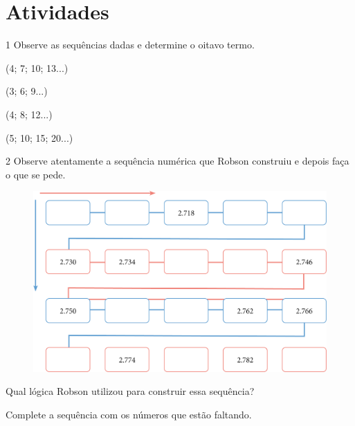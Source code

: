 \section{Atividades}

\num{1} Observe as sequências dadas e determine o oitavo termo.

\begin{escolha}
  \item (4; 7; 10; 13...) 

  \item (3; 6; 9...) 

  \item (4; 8; 12...) 

  \item (5; 10; 15; 20...) 
  \end{escolha}

\num{2} Observe atentamente a sequência numérica que Robson construiu e depois
faça o que se pede.

\begin{figure}[htpb!]
\centering
\includegraphics[width=.8\textwidth]{media/image17.png}
\end{figure}

\begin{escolha}
\item
  Qual lógica Robson utilizou para construir essa sequência?


\item
  Complete a sequência com os números que estão faltando.

\end{escolha}

